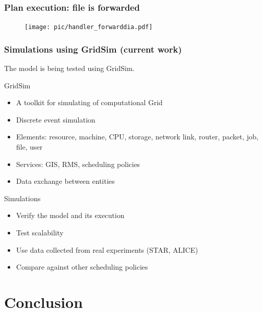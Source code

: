 \documentclass{beamer}
\begin{document}
\begin{frame}\frametitle{Plan execution: file is forwarded}
\begin{figure}[h]
		\texttt{[image: pic/handler\_forwarddia.pdf]}
	\label{real_network}
\end{figure} 
\end{frame}


\begin{frame}\frametitle{Simulations using GridSim (current work)}
The model is being tested using GridSim.
\begin{block}{GridSim}
  \begin{itemize}
    \item A toolkit for simulating of computational Grid
    \item Discrete event simulation 
    \item Elements: resource, machine, CPU, storage, network link, router, packet, job, file, user
    \item Services: GIS, RMS, scheduling policies
    \item Data exchange between entities
  \end{itemize}
\end{block}

\begin{block}{Simulations}
  \begin{itemize}
    \item Verify the model and its execution
    \item Test scalability
    \item Use data collected from real experiments (STAR, ALICE)
    \item Compare against other scheduling policies 
  \end{itemize}
\end{block}


\end{frame}

\section{Conclusion}
\end{document}
